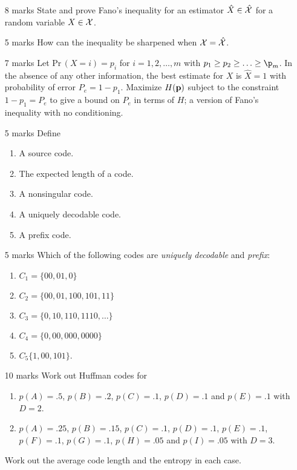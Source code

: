 \documentclass[12pt]{article}
\begin{document}
\begin{enumerate}
\begin{enumerate}
\begin{enumerate}
\end{enumerate}

\item %
\begin{enumerate} 
\item [8 marks] State and prove Fano's inequality for an estimator $\hat{X}\in\hat{\cal X}$ for a random variable $X\in{\cal X}$.
\item [5 marks] How can the inequality be sharpened when ${\cal X}=\hat{{\cal X}}$.
\item [7 marks] Let $\mbox{Pr}\,(X=i)=p_i$ for $i=1,2,\ldots,m$ with $p_1\ge p_2\ge \ldots \ge\p_m$. In the absence of any other information, the best estimate for $X$ is $\hat{X}=1$ with probability of error $P_e=1-p_1$. Maximize $H({\bf p})$ subject to the constraint $1-p_1=P_e$ to give a bound on $P_e$ in terms of $H$; a version of Fano's inequality with no conditioning.
\end{enumerate}

\item %
\begin{enumerate}
\item [5 marks] Define 
\begin{enumerate}
\item A source code.
\item The expected length of a code.
\item A nonsingular code.
\item A uniquely decodable code.
\item A prefix code.
\end{enumerate}
\item [5 marks] Which of the following codes are {\sl uniquely decodable} and {\sl prefix}:
\begin{enumerate}
\item $C_1=\{00,01,0\}$
\item $C_2=\{00,01,100,101,11\}$
\item $C_3=\{0,10,110,1110,\ldots\}$
\item $C_4=\{0,00,000,0000\}$
\item $C_5\{1,00,101\}$.
\end{enumerate}
\item [10 marks] Work out Huffman codes for
\begin{enumerate}
\item $p(A)=.5$, $p(B)=.2$, $p(C)=.1$, $p(D)=.1$ and $p(E)=.1$ with $D=2$.
\item $p(A)=.25$, $p(B)=.15$, $p(C)=.1$, $p(D)=.1$, $p(E)=.1$, $p(F)=.1$, $p(G)=.1$, $p(H)=.05$ and $p(I)=.05$ with $D=3$.
\end{enumerate}
Work out the average code length and the entropy in each case.
\end{enumerate}



\end{document}
